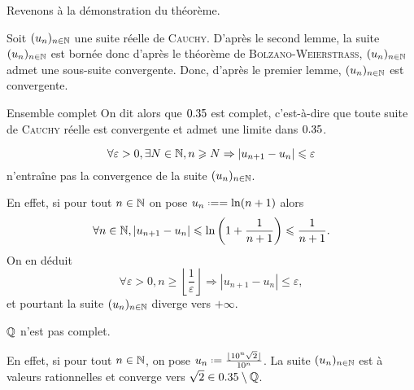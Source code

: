 Revenons à la démonstration du théorème.

\begin{preuve}
    Soit $(u_n)_{n \in \mathbb{N}}$ une suite réelle de \textsc{Cauchy}. D'après le second lemme, la suite $(u_n)_{n \in \mathbb{N}}$ est bornée donc d'après le théorème de \textsc{Bolzano}-\textsc{Weierstrass}, $(u_n)_{n \in \mathbb{N}}$ admet une sous-suite convergente. Donc, d'après le premier lemme, $(u_n)_{n \in \mathbb{N}}$ est convergente. 
\end{preuve}

\begin{defi}{Ensemble complet}
    On dit alors que $0.35$ est complet, c'est-à-dire que toute suite de \textsc{Cauchy} réelle est convergente et admet une limite dans $0.35$. 
\end{defi}

\begin{remarque}
    $$\forall \varepsilon > 0, \exists N \in \mathbb{N}, n \geqslant N \Rightarrow |u_{n+1} - u_n| \leqslant \varepsilon$$
    n'entraîne pas la convergence de la suite $(u_n)_{n \in \mathbb{N}}$.
\end{remarque}

En effet, si pour tout $n \in \mathbb{N}$ on pose $u_n \defeq = \ln(n+1)$ alors
$$\forall n \in \mathbb{N}, |u_{n+1} - u_n| \leqslant \ln \left( 1 + \frac{1}{n+1} \right) \leqslant \frac{1}{n+1}.$$
On en déduit
$$\forall \varepsilon > 0, n \geqslant \left \lfloor \frac{1}{\varepsilon} \right \rfloor \Rightarrow |u_{n+1} - u_n| \leqslant \varepsilon,$$
et pourtant la suite $(u_n)_{n \in \mathbb{N}}$ diverge vers $+ \infty$.

\begin{remarque}
    $\mathbb{Q}$ n'est pas complet.
\end{remarque}

En effet, si pour tout $n \in \mathbb{N}$, on pose $u_n \defeq \frac{\lfloor 10^n \sqrt{2} \rfloor}{10^n}$. La suite $(u_n)_{n \in \mathbb{N}}$ est à valeurs rationnelles et converge vers $\sqrt{2} \in 0.35 \setminus \mathbb{Q}$. 